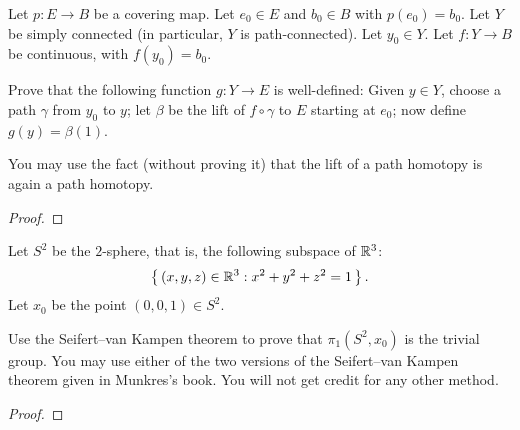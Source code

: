 \begin{problem}
Let $p\colon E\to B$ be a covering map. Let $e_0\in E$ and $b_0\in B$ with
$p(e_0)=b_0$. Let $Y$ be simply connected (in particular, $Y$ is
path-connected). Let $y_0\in Y$. Let $f\colon Y\to B$ be continuous, with
$f(y_0)=b_0$.

Prove that the following function $g\colon Y\to E$ is well-defined: Given
$y\in Y$, choose a path $\gamma$ from $y_0$ to $y$; let $\beta$ be the lift
of $f\circ\gamma$ to $E$ starting at $e_0$; now define $g(y)=\beta(1)$.

You may use the fact (without proving it) that the lift of a path homotopy
is again a path homotopy.
\end{problem}
\begin{proof}
\end{proof}

\begin{problem}
Let $S^2$ be the $2$-sphere, that is, the following subspace of $\mathbb{R}^3$:
\[
\left\{\,(x,y,z)\in\mathbb{R}^3:x^2+y^2+z^2=1\,\right\}.
\]
Let $x_0$ be the point $(0,0,1)\in S^2$.

Use the Seifert--van Kampen theorem to prove that $\pi_1(S^2,x_0)$ is the
trivial group. You may use either of the two versions of the Seifert--van
Kampen theorem given in Munkres's book. You will not get credit for any
other method.
\end{problem}
\begin{proof}
\end{proof}

